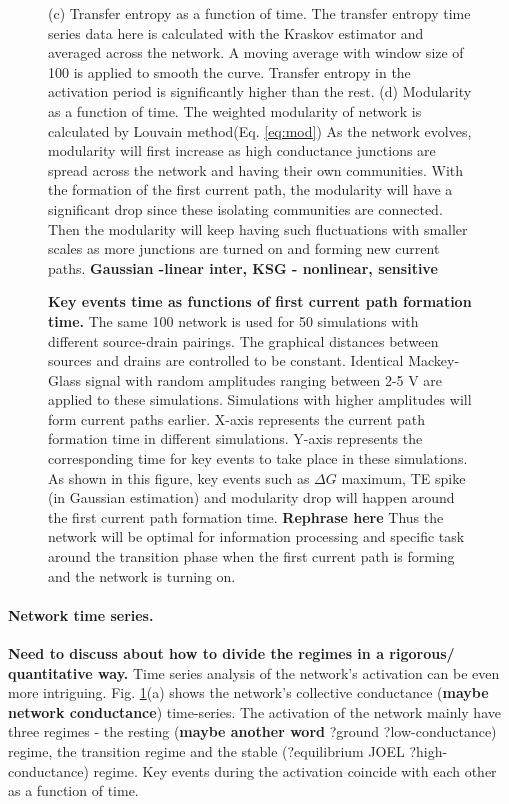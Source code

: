 \documentclass[fleqn,10pt,  reprint, amsmath,amssymb,aps, floatfix]{wlscirep}
\begin{document}
\begin{figure}
{			\newline (c) Transfer entropy as a function of time. The transfer entropy time series data here is calculated with the Kraskov estimator and averaged across the network. A moving average with window size of 100 is applied to smooth the curve. Transfer entropy in the activation period is significantly higher than the rest.
			\newline (d) Modularity as a function of time. The weighted modularity of network is calculated by Louvain method(Eq. \ref{eq:mod}) As the network evolves, modularity will first increase as high conductance junctions are spread across the network and having their own communities. With the formation of the first current path, the modularity will have a significant drop since these isolating communities are connected. Then the modularity will keep having such fluctuations with smaller scales as more junctions are turned on and forming new current paths.
			\textbf{Gaussian -linear inter, KSG - nonlinear, sensitive}}
	
	\caption{\textbf{Key events time as functions of first current path formation time.} 
			The same 100 network is used for 50 simulations with different source-drain pairings. The graphical distances between sources and drains are controlled to be constant. Identical Mackey-Glass signal with random amplitudes ranging between 2-5 V are applied to these simulations. Simulations with higher amplitudes will form current paths earlier. 
			\newline 
			X-axis represents the current path formation time in different simulations. Y-axis represents the corresponding time for key events to take place in these simulations. As shown in this figure, key events such as $\Delta G$ maximum, TE spike (in Gaussian estimation) and modularity drop will happen around the first current path formation time. 
			\newline
			\textbf{Rephrase here} Thus the network will be optimal for information processing and specific task around the transition phase when the first current path is forming and the network is turning on. }
	\label{fig:time_series}
\end{figure}

\paragraph{Network time series.}

\textbf{Need to discuss about how to divide the regimes in a rigorous/ quantitative way.}
Time series analysis of the network's activation can be even more intriguing. Fig. \ref{fig:time_series}(a) shows the network's collective conductance (\textbf{maybe network conductance}) time-series. The activation of the network mainly have three regimes - the resting (\textbf{maybe another word} ?ground ?low-conductance) regime, the transition regime and the stable (?equilibrium JOEL ?high-conductance) regime. Key events during the activation coincide with each other as a function of time. 
\end{document}
